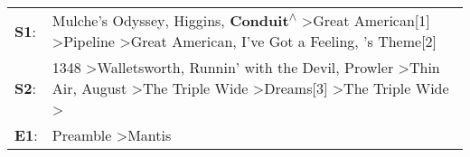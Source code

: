 \begin{supertabular}{p{0.03\textwidth}p{0.92\textwidth}}
 \textbf{S1}:  &                                                                                 Mulche's Odyssey\textsuperscript{}, \enspace Higgins\textsuperscript{}, \enspace \textbf{Conduit\textsuperscript{$\wedge$}} \textgreater \enspace Great American[1]\textsuperscript{} \textgreater \enspace Pipeline\textsuperscript{} \textgreater \enspace Great American\textsuperscript{}, \enspace I've Got a Feeling\textsuperscript{}, 's Theme[2]\textsuperscript{}  \enspace  \\
 \textbf{S2}:  &  1348\textsuperscript{} \textgreater \enspace Walletsworth\textsuperscript{}, \enspace Runnin' with the Devil\textsuperscript{}, \enspace Prowler\textsuperscript{} \textgreater \enspace Thin Air\textsuperscript{}, \enspace August\textsuperscript{} \textgreater \enspace The Triple Wide\textsuperscript{} \textgreater \enspace Dreams[3]\textsuperscript{} \textgreater \enspace The Triple Wide\textsuperscript{} \textgreater {}\textsuperscript{}  \enspace  \\
 \textbf{E1}:  &                                                                                                                                                                                                                                                                                                                                                                                              Preamble\textsuperscript{} \textgreater \enspace Mantis\textsuperscript{}  \enspace  \\
\end{supertabular}
